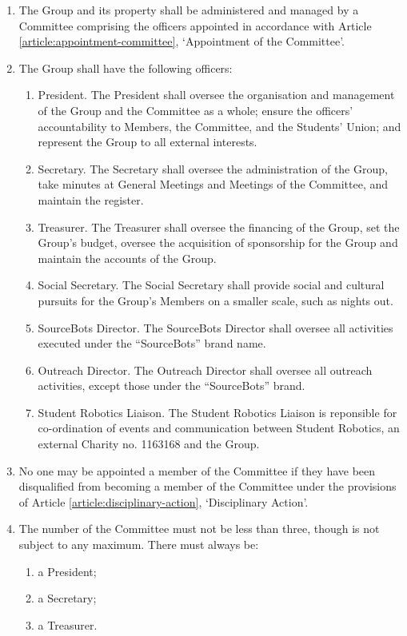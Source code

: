 \documentclass[12pt]{constitution}
\begin{document}
\begin{enumerate}
    \item The Group and its property shall be administered and managed by a Committee comprising the officers appointed in accordance with Article \ref{article:appointment-committee}, `Appointment of the Committee'.
    \item The Group shall have the following officers:
    \begin{enumerate}
        \item President. The President shall oversee the organisation and management of the Group and the Committee as a whole; ensure the officers' accountability to Members, the Committee, and the Students' Union; and represent the Group to all external interests.
        \item Secretary. The Secretary shall oversee the administration of the Group, take minutes at General Meetings and Meetings of the Committee, and maintain the register.
        \item Treasurer. The Treasurer shall oversee the financing of the Group, set the Group's budget, oversee the acquisition of sponsorship for the Group and maintain the accounts of the Group.
        \item Social Secretary. The Social Secretary shall provide social and cultural pursuits for the Group’s Members on a smaller scale, such as nights out.
        \item SourceBots Director. The SourceBots Director shall oversee all activities executed under the ``SourceBots'' brand name.
        \item Outreach Director. The Outreach Director shall oversee all outreach activities, except those under the ``SourceBots'' brand.
        \item Student Robotics Liaison. The Student Robotics Liaison is reponsible for co-ordination of events and communication between Student Robotics, an external Charity no. 1163168 and the Group.
    \end{enumerate}

    \item No one may be appointed a member of the Committee if they have been disqualified from becoming a member of the Committee under the provisions of Article \ref{article:disciplinary-action}, `Disciplinary Action'.
    \item The number of the Committee must not be less than three, though is not subject to any maximum. There must always be:
    \begin{enumerate}
        \item a President;
        \item a Secretary;
        \item a Treasurer.
    \end{enumerate}


\end{enumerate}
\end{document}
